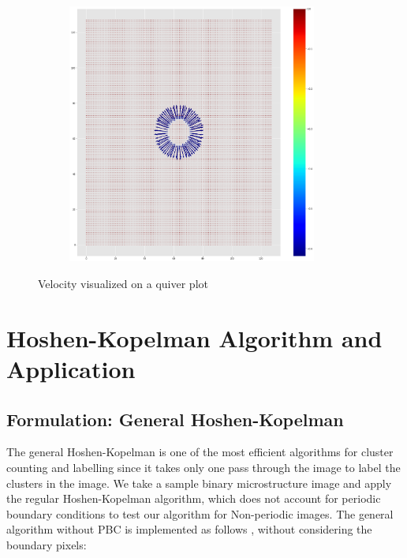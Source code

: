 \documentclass[12pt, a4paper]{report}
\begin{document}
\begin{figure}[H]
\centering
\begin{subfigure}{.6\textwidth}
  \centering
  \includegraphics[width=0.9\textwidth]{Pictures/Level Set/level_set_velocity.png}
  \label{img:microstrImg}
\end{subfigure}
\caption{Velocity visualized on a quiver plot}
\label{fig:test}
\end{figure}


\section{Hoshen-Kopelman Algorithm and Application}

\subsection{Formulation: General Hoshen-Kopelman}

The general Hoshen-Kopelman \cite{28hoshen1976percolation} is one of the most efficient algorithms for cluster counting and labelling since it takes only one pass through the image to label the clusters in the image. We take a sample binary microstructure image and apply the regular Hoshen-Kopelman algorithm, which does not account for periodic boundary conditions to test our algorithm for Non-periodic images. The general algorithm without PBC is implemented as follows \cite{29fricke2004hoshen}, without considering the boundary pixels:
\end{document}
